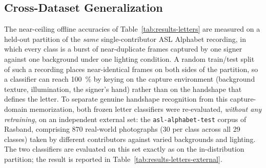 \subsection{Cross-Dataset Generalization}
\label{sec:results-letters-crossdataset}

The near-ceiling offline accuracies of
Table~\ref{tab:results-letters} are measured on a held-out partition
of the \emph{same} single-contributor ASL Alphabet recording, in
which every class is a burst of near-duplicate frames captured by one
signer against one background under one lighting condition. A random
train/test split of such a recording places near-identical frames on
both sides of the partition, so a classifier can reach
\SI{100}{\percent} by keying on the capture environment (background
texture, illumination, the signer's hand) rather than on the
handshape that defines the letter. To separate genuine handshape
recognition from this capture-domain memorization, both frozen letter
classifiers were re-evaluated, \emph{without any retraining}, on an
independent external set: the \texttt{asl-alphabet-test} corpus of
Rasband, comprising \num{870} real-world photographs (\num{30} per
class across all 29 classes) taken by different contributors against
varied backgrounds and lighting. The two classifiers are evaluated on
this set exactly as on the in-distribution partition; the result is
reported in Table~\ref{tab:results-letters-external}.

